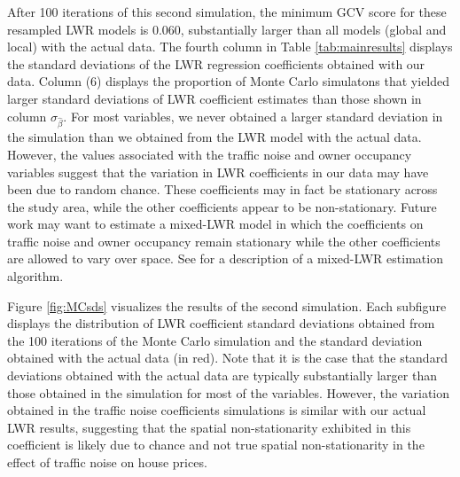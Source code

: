 \documentclass{article}\usepackage{graphicx, color}
\begin{document}
After 100 iterations of this second simulation, the minimum GCV score for these resampled LWR models is 0.060, substantially larger than all models (global and local) with the actual data. The fourth column in Table \ref{tab:mainresults} displays the standard deviations of the LWR regression coefficients obtained with our data. Column (6) displays the proportion of Monte Carlo simulatons that yielded larger standard deviations of LWR coefficient estimates than those shown in column $\sigma_{\hat{\beta}}$. For most variables, we never obtained a larger standard deviation in the simulation than we obtained from the LWR model with the actual data. However, the values associated with the traffic noise and owner occupancy variables suggest that the variation in LWR coefficients in our data may have been due to random chance. These coefficients may in fact be stationary across the study area, while the other coefficients appear to be non-stationary. Future work may want to estimate a mixed-LWR model in which the coefficients on traffic noise and owner occupancy remain stationary while the other coefficients are allowed to vary over space. See \citet{Fotheringham2002} for a description of a mixed-LWR estimation algorithm. 

Figure \ref{fig:MCsds} visualizes the results of the second simulation. Each subfigure displays the distribution of LWR coefficient standard deviations obtained from the 100 iterations of the Monte Carlo simulation and the standard deviation obtained with the actual data (in red). Note that it is the case that the standard deviations obtained with the actual data are typically substantially larger than those obtained in the simulation for most of the variables. However, the variation obtained in the traffic noise coefficients simulations is similar with our actual LWR results, suggesting that the spatial non-stationarity exhibited in this coefficient is likely due to chance and not true spatial non-stationarity in the effect of traffic noise on house prices. 
\end{document}
